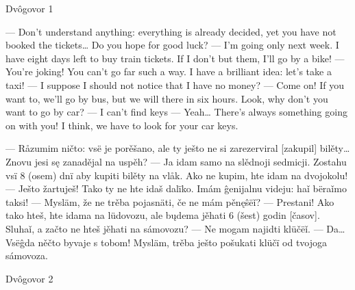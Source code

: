 Dvôgovor 1

— Don’t understand anything: everything is already decided, yet you have not booked the tickets… Do you hope for good luck?
— I’m going only next week. I have eight days left to buy train tickets. If I don’t but them, I’ll go by a bike!
— You’re joking! You can’t go far such a way. I have a brilliant idea: let’s take a taxi!
— I suppose I should not notice that I have no money?
— Come on! If you want to, we’ll go by bus, but we will there in six hours. Look, why don’t you want to go by car?
— I can’t find keys
— Yeah… There’s always something going on with you! I think, we have to look for your car keys.


— Råzumim ničto: vsë je porěšano, ale ty ješto ne si zarezerviral [zakupil] bilěty… Znovu jesi sę zanadějal na uspěh?
— Ja idam samo na slědnoji sedmicji. Zostahu vsï 8 (osem) dnï aby kupiti bilěty na vlåk. Ako ne kupim, hte idam na dvojokolu!
— Ješto žartuješ! Tako ty ne hte idaš dalïko. Imám ĝenijalnu videju: haǐ bëraǐmo taksi!
— Mysläm, že ne trěba pojasnäti, če ne mám pěnęŝëǐ?
— Prestani! Ako tako hteš, hte idama na lüdovozu, ale bųdema jěhati 6 (šest) godin [časov]. Sluhaǐ, a začto ne hteš jěhati na sámovozu?
— Ne mogam najidti klüčëǐ.
— Da… Vsëĝda něčto byvaje s tobom! Mysläm, trěba ješto pošukati klüčï od tvojoga sámovoza.


Dvôgovor 2

